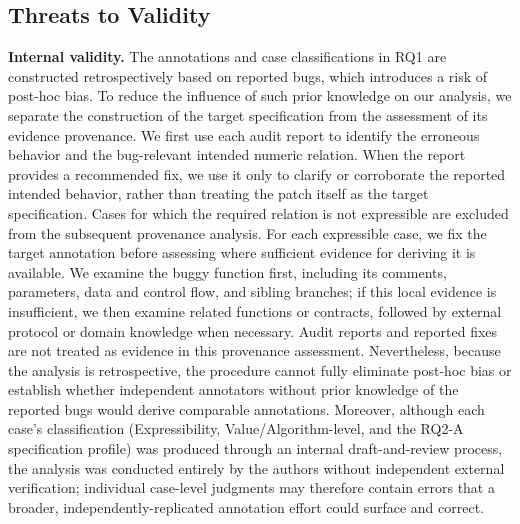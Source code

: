 \documentclass[pdflatex,sn-basic]{sn-jnl}%
\theoremstyle{thmstyleone}%
\theoremstyle{thmstyletwo}%
\theoremstyle{thmstylethree}%
\begin{document}
\subsection{Threats to Validity}\label{sec:threats}

\noindent\textbf{Internal validity.}
The annotations and case classifications in RQ1 are constructed retrospectively based on reported bugs, which introduces a risk of post-hoc bias. To reduce the influence of such prior knowledge on our analysis, we separate the construction of the target specification from the assessment of its evidence provenance. We first use each audit report to identify the erroneous behavior and the bug-relevant intended numeric relation. When the report provides a recommended fix, we use it only to clarify or corroborate the reported intended behavior, rather than treating the patch itself as the target specification. Cases for which the required relation is not expressible are excluded from the subsequent provenance analysis. For each expressible case, we fix the target annotation before assessing where sufficient evidence for deriving it is available. We examine the buggy function first, including its comments, parameters, data and control flow, and sibling branches; if this local evidence is insufficient, we then examine related functions or contracts, followed by external protocol or domain knowledge when necessary. Audit reports and reported fixes are not treated as evidence in this provenance assessment. Nevertheless, because the analysis is retrospective, the procedure cannot fully eliminate post-hoc bias or establish whether independent annotators without prior knowledge of the reported bugs would derive comparable annotations. %
Moreover, although each case's classification (Expressibility, Value/Algorithm-level, and the RQ2-A specification profile) was produced through an internal draft-and-review process, the analysis was conducted entirely by the authors without independent external verification; individual case-level judgments may therefore contain errors that a broader, independently-replicated annotation effort could surface and correct.
\end{document}
